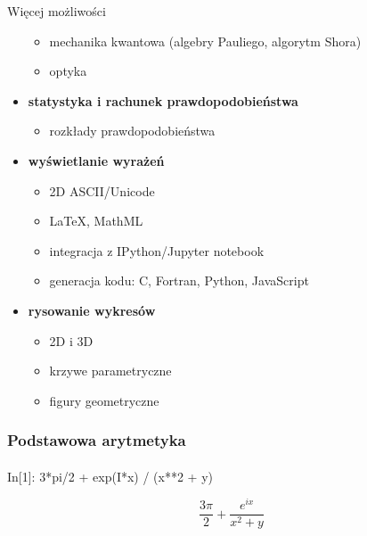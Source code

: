 \documentclass[10pt]{beamer}
\begin{document}
\begin{frame}{Więcej możliwości}
\begin{multicols}{2}
\begin{itemize}
\begin{itemize}
          \item mechanika kwantowa (algebry Pauliego, algorytm Shora)
          \item optyka
        \end{itemize}
      \item \textbf{statystyka i rachunek prawdopodobieństwa}
        \begin{itemize}
          \tiny
          \item rozkłady prawdopodobieństwa
        \end{itemize}
      \item \textbf{wyświetlanie wyrażeń}
        \begin{itemize}
          \tiny
          \item 2D ASCII/Unicode
          \item LaTeX, MathML
          \item integracja z IPython/Jupyter notebook
          \item generacja kodu: C, Fortran, Python, JavaScript
        \end{itemize}
      \item \textbf{rysowanie wykresów}
        \begin{itemize}
          \tiny
          \item 2D i 3D
          \item krzywe parametryczne
          \item figury geometryczne
        \end{itemize}
    \end{itemize}
  \end{multicols}
\end{frame}

\begin{frame}[fragile]
  \frametitle{Podstawowa arytmetyka}
  \framesubtitle{}

  \begin{python}
    In[1]: 3*pi/2 + exp(I*x) / (x**2 + y)
  \end{python}
  \begin{equation*}
    \frac{3 \pi}{2} + \frac{e^{i x}}{x^{2} + y}
  \end{equation*}
\end{frame}
\end{document}
